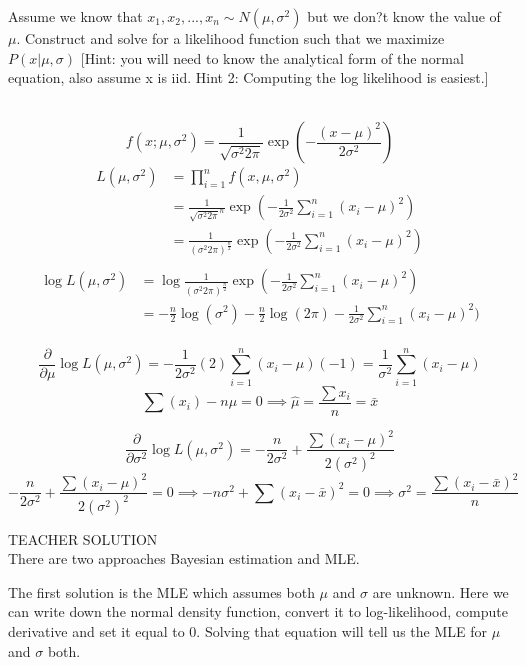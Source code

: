 \documentclass[draft]{exam} %
\theoremstyle{definition} \newtheorem*{defn}{Definition}
\begin{document}
\begin{questions}
\question Assume we know that $x_1, x_2, . . . , x_n \sim N(\mu, \sigma^2)$ but we don?t know the value of $\mu$. Construct and solve for a likelihood function such that we maximize $P(x|\mu, \sigma)$ [Hint: you will need to know the analytical form of the normal equation, also assume x is iid. Hint 2: Computing the log likelihood is easiest.]
\begin{solution} \\%
$$f(x;\mu , \sigma^2) = \frac{1}{\sqrt{\sigma^2 2 \pi}}\exp{(-\frac{(x-\mu)^2}{2\sigma^2})}$$
\begin{equation}
\begin{split}
L(\mu,\sigma^2) & = \prod_{i=1}^{n}f(x,\mu , \sigma^2)\\
& =\frac{1}{\sqrt{\sigma^2 2 \pi}^n} \exp{(-\frac{1}{2\sigma^2} \sum_{i=1}^n (x_i - \mu)^2)}\\
& =\frac{1}{(\sigma^2 2 \pi)^{\frac{n}{2}}} \exp{(-\frac{1}{2\sigma^2} \sum_{i=1}^n (x_i - \mu)^2)}\\
\end{split}
\end{equation}
\begin{equation}
\begin{split}
\log{L(\mu,\sigma^2)} & = \log{\frac{1}{(\sigma^2 2 \pi)^{\frac{n}{2}}}} \exp{(-\frac{1}{2\sigma^2} \sum_{i=1}^n (x_i - \mu)^2)}\\
& = -\frac{n}{2}\log{(\sigma^2)}-\frac{n}{2}\log{(2 \pi)}-\frac{1}{2\sigma^2} \sum_{i=1}^n (x_i - \mu)^2)\\
\end{split}
\end{equation}

$$\frac{\partial}{\partial \mu} \log{L{(\mu , \sigma^2)}} = -\frac{1}{2\sigma^2} (2)\sum_{i=1}^n (x_i - \mu)(-1)= \frac{1}{\sigma^2}\sum_{i=1}^n (x_i - \mu)$$
$$\sum(x_i) - n \mu = 0 \implies \hat\mu = \frac{\sum x_i}{n} = \bar{x}$$

$$\frac{\partial}{\partial \sigma^2} \log{L{(\mu , \sigma^2)}} = -\frac{n}{2\sigma^2} + \frac{\sum(x_i-\mu)^2}{2(\sigma^2)^2}$$
$$-\frac{n}{2\sigma^2} + \frac{\sum(x_i-\mu)^2}{2(\sigma^2)^2} = 0 \implies -n\sigma^2 + \sum(x_i-\bar{x})^2 = 0 \implies \hat{\sigma^2} = \frac{\sum(x_i-\bar{x})^2}{n}$$

TEACHER SOLUTION\\
There are two approaches Bayesian estimation and MLE. 

The first solution is the MLE which assumes both $\mu$ and $\sigma$ are unknown. Here we can write down the normal density function, convert it to log-likelihood, compute derivative and set it equal to $0$. Solving that equation will tell us the MLE for $\mu$ and $\sigma$ both.


\end{solution}
\end{questions}
\end{document}
